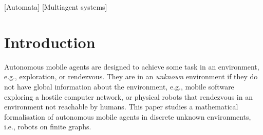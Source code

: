 \documentclass{aamas2015}
\newcommand{\sr}[1]{\footnote{{\color{red} Note. #1}}}
\begin{document}
\begin{abstract}
%
%
%
\end{abstract}

[Automata]
[Multiagent systems]



\section{Introduction}

Autonomous mobile agents are designed to achieve some task in an environment, e.g., exploration, or rendezvous. They are in an {\em unknown} environment if they do not have global information about the environment, e.g., mobile software exploring a hostile computer network, or physical robots that rendezvous in an environment not reachable by humans.  This paper studies a mathematical formalisation of autonomous mobile agents in discrete unknown environments, i.e., robots on finite graphs. 
\end{document}
